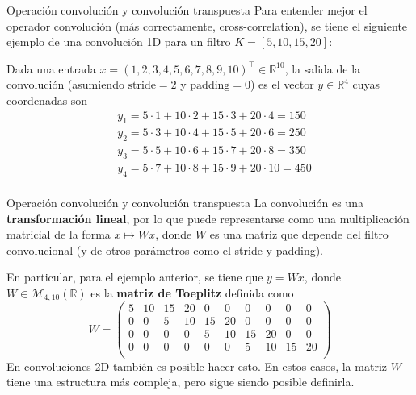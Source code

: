 \documentclass{beamer}
\newcommand{\R}{\mathbb{R}}
\begin{document}
\begin{frame}{Operación convolución y convolución transpuesta}
    Para entender mejor el operador convolución (más correctamente, cross-correlation), se tiene el siguiente ejemplo de una convolución 1D para un filtro $K=[5, 10, 15, 20]$:

    Dada una entrada $x=(1,2,3,4,5,6,7,8,9,10)^\top\in\R^{10}$, la salida de la convolución (asumiendo $\text{stride}=2$ y $\text{padding}=0$) es el vector $y\in\R^4$  cuyas coordenadas son
    \begin{align*}
         & y_1=5\cdot1 + 10\cdot2 + 15\cdot3 +20\cdot4  =150 \\
         & y_2=5\cdot3 + 10\cdot4 + 15\cdot5 +20\cdot6  =250 \\
         & y_3=5\cdot5 + 10\cdot6 + 15\cdot7 +20\cdot8  =350 \\
         & y_4=5\cdot7 + 10\cdot8 + 15\cdot9 +20\cdot10 =450 \\
    \end{align*}
\end{frame}

\begin{frame}{Operación convolución y convolución transpuesta}
    La convolución es una \textbf{transformación lineal}, por lo que puede representarse como una multiplicación matricial de la forma $x\mapsto Wx$, donde $W$ es una matriz que depende del filtro convolucional (y de otros parámetros como el stride y padding).

    En particular, para el ejemplo anterior, se tiene que $y=Wx$, donde $W\in\mathcal{M}_{4,10}(\R)$ es la \textbf{matriz de Toeplitz} definida como
    \begin{equation*}
        W=\begin{pmatrix}
            5 & 10 & 15 & 20 & 0  & 0  & 0  & 0  & 0  & 0  \\
            0 & 0  & 5  & 10 & 15 & 20 & 0  & 0  & 0  & 0  \\
            0 & 0  & 0  & 0  & 5  & 10 & 15 & 20 & 0  & 0  \\
            0 & 0  & 0  & 0  & 0  & 0  & 5  & 10 & 15 & 20 \\
        \end{pmatrix}
    \end{equation*}
    En convoluciones 2D también es posible hacer esto. En estos casos, la matriz $W$ tiene una estructura más compleja, pero sigue siendo posible definirla.
\end{frame}
\end{document}
